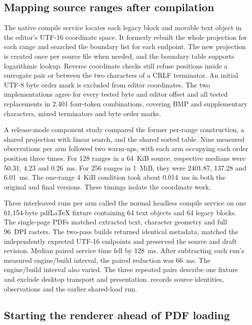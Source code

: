 \subsection{Mapping source ranges after compilation}

The native compile service locates each legacy block and movable text object
in the editor's UTF-16 coordinate space. It formerly rebuilt the whole
projection for each range and searched the boundary list for each endpoint.
The new projection is created once per source file when needed, and the
boundary table supports logarithmic lookup. Reverse coordinate checks still
refuse positions inside a surrogate pair or between the two characters of a
CRLF terminator. An initial UTF-8 byte order mark is excluded from editor
coordinates. The two implementations agree for every tested byte and editor
offset and all tested replacements in 2,401 four-token combinations, covering
BMP and supplementary characters, mixed terminators and byte order marks.

A release-mode component study compared the former per-range construction,
a shared projection with linear search, and the shared sorted table. Nine
measured observations per arm followed two warm-ups, with each arm occupying
each order position three times. For 128 ranges in a 64~KiB source, respective
medians were 50.31, 4.23 and 0.26~ms. For 256 ranges in 1~MiB, they were
2401.87, 137.28 and 6.01~ms. The one-range 4~KiB condition took about
0.014~ms in both the original and final versions. These timings isolate the
coordinate work.

Three interleaved runs per arm called the normal headless compile service on
one 61,154-byte pdf\LaTeX{} fixture containing 64 text objects and 64 legacy
blocks. The single-page PDFs matched extracted text, character geometry and
full 96~DPI rasters. The two-pass builds returned identical metadata, matched
the independently expected UTF-16 endpoints and preserved the source and
draft revision. Median paired service time fell by 128~ms. After subtracting
each run's measured engine/build interval, the paired reduction was 66~ms.
The engine/build interval also varied. The three repeated pairs describe one
fixture and exclude desktop transport and presentation.
 records
source identities, observations and the earlier shared-load run.


\subsection{Starting the renderer ahead of PDF loading}

